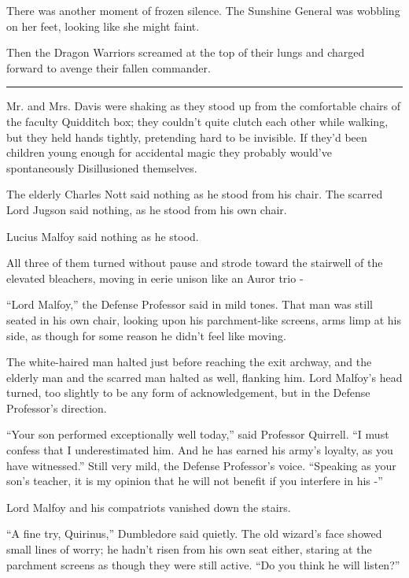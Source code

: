 There was another moment of frozen silence. The Sunshine General was
wobbling on her feet, looking like she might faint.

Then the Dragon Warriors screamed at the top of their lungs and charged
forward to avenge their fallen commander.

\begin{center}\rule{3in}{0.4pt}\end{center}

Mr. and Mrs. Davis were shaking as they stood up from the comfortable
chairs of the faculty Quidditch box; they couldn't quite clutch each
other while walking, but they held hands tightly, pretending hard to be
invisible. If they'd been children young enough for accidental magic
they probably would've spontaneously Disillusioned themselves.

The elderly Charles Nott said nothing as he stood from his chair. The
scarred Lord Jugson said nothing, as he stood from his own chair.

Lucius Malfoy said nothing as he stood.

All three of them turned without pause and strode toward the stairwell
of the elevated bleachers, moving in eerie unison like an Auror trio -

``Lord Malfoy,'' the Defense Professor said in mild tones. That man was
still seated in his own chair, looking upon his parchment-like screens,
arms limp at his side, as though for some reason he didn't feel like
moving.

The white-haired man halted just before reaching the exit archway, and
the elderly man and the scarred man halted as well, flanking him. Lord
Malfoy's head turned, too slightly to be any form of acknowledgement,
but in the Defense Professor's direction.

``Your son performed exceptionally well today,'' said Professor
Quirrell. ``I must confess that I underestimated him. And he has earned
his army's loyalty, as you have witnessed.'' Still very mild, the
Defense Professor's voice. ``Speaking as your son's teacher, it is my
opinion that he will not benefit if you interfere in his -''

Lord Malfoy and his compatriots vanished down the stairs.

``A fine try, Quirinus,'' Dumbledore said quietly. The old wizard's face
showed small lines of worry; he hadn't risen from his own seat either,
staring at the parchment screens as though they were still active. ``Do
you think he will listen?''

